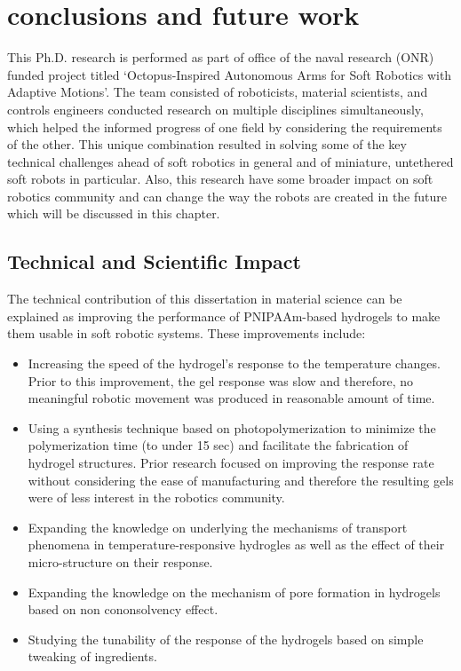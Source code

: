 \graphicspath{{Images/conclusion/}}

\chapter{conclusions and future work}
\label{chap:conclusion}
This Ph.D. research is performed as part of office of the naval research (ONR) funded project titled `Octopus-Inspired Autonomous Arms for Soft Robotics with Adaptive Motions'. The team consisted of roboticists, material scientists, and controls engineers conducted research on multiple disciplines simultaneously, which helped the informed progress of one field by considering the requirements of the other. This unique combination resulted in solving some of the key technical challenges ahead of soft robotics in general and of miniature, untethered soft robots in particular. Also, this research have some broader impact on soft robotics community and can change the way the robots are created in the future which will be discussed in this chapter.
\section{Technical and Scientific Impact}
The technical contribution of this dissertation in material science can be explained as improving the performance of PNIPAAm-based hydrogels to make them usable in soft robotic systems. These improvements include:
\begin{itemize}
 \item Increasing the speed of the hydrogel's response to the temperature changes. Prior to this improvement, the gel response was slow and therefore, no meaningful robotic movement was produced in reasonable amount of time. 
 \item Using a synthesis technique based on photopolymerization to minimize the polymerization time (to under 15 sec) and facilitate the fabrication of hydrogel structures. Prior research focused on improving the response rate without considering the ease of manufacturing and therefore the resulting gels were of less interest in the robotics community.
 \item Expanding the knowledge on underlying the mechanisms of transport phenomena in temperature-responsive hydrogles as well as the effect of their micro-structure on their response. 
 \item Expanding the knowledge on the mechanism of pore formation in hydrogels based on non cononsolvency effect. 
 \item Studying the tunability of the response of the hydrogels based on simple tweaking of ingredients. 
\end{itemize}
	

